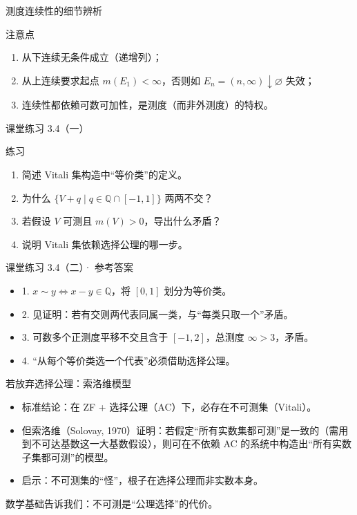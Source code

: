 \documentclass[aspectratio=169,11pt]{ctexbeamer}
\begin{document}
\begin{frame}{测度连续性的细节辨析}
  \begin{block}{注意点}
    \begin{enumerate}
      \item 从下连续\alert{无条件}成立（递增列）；
      \item 从上连续要求起点 $m(E_1)<\infty$，否则如 $E_n=(n,\infty)\downarrow\varnothing$ 失效；
      \item 连续性都依赖\alert{可数可加性}，是测度（而非外测度）的特权。
    \end{enumerate}
  \end{block}
\end{frame}

\begin{frame}{课堂练习 3.4（一）}
  \begin{block}{练习}
    \begin{enumerate}
      \item 简述 Vitali 集构造中“等价类”的定义。
      \item 为什么 $\{V+q\mid q\in\mathbb{Q}\cap[-1,1]\}$ 两两不交？
      \item 若假设 $V$ 可测且 $m(V)>0$，导出什么矛盾？
      \item 说明 Vitali 集依赖选择公理的哪一步。
    \end{enumerate}
  \end{block}
\end{frame}

\begin{frame}{课堂练习 3.4（二）· 参考答案}
  \begin{itemize}
    \item 1. $x\sim y\iff x-y\in\mathbb{Q}$，将 $[0,1]$ 划分为等价类。
    \item 2. 见证明：若有交则两代表同属一类，与“每类只取一个”矛盾。
    \item 3. 可数多个正测度平移不交且含于 $[-1,2]$，总测度 $\infty>3$，矛盾。
    \item 4. “从每个等价类选一个代表”必须借助选择公理。
  \end{itemize}
\end{frame}

\begin{frame}{若放弃选择公理：索洛维模型}
  \begin{itemize}
    \item 标准结论：在 ZF + 选择公理（AC）下，必存在不可测集（Vitali）。
    \item 但索洛维（Solovay, 1970）证明：若假定“所有实数集都可测”是一致的（需用到不可达基数这一大基数假设），则可在不依赖 AC 的系统中构造出“所有实数子集都可测”的模型。
    \item 启示：不可测集的“怪”，根子在\alert{选择公理}而非实数本身。
  \end{itemize}
  \begin{center}
    \color{clouddeep}\small 数学基础告诉我们：不可测是“公理选择”的代价。
  \end{center}
\end{frame}
\end{document}
